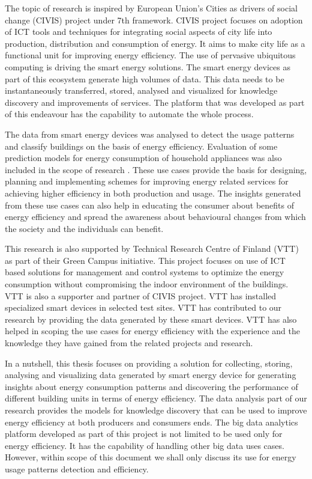 The topic of research is inspired by European Union's Cities as drivers of social change (CIVIS) project under 7th framework. CIVIS project focuses on adoption of ICT tools and techniques for integrating social aspects of city life into production, distribution and consumption of energy. It aims to make city life as a functional unit for improving energy efficiency. The use of pervasive ubiquitous computing is driving the smart energy solutions. The smart energy devices as part of this ecosystem generate high volumes of data. This data needs to be instantaneously transferred, stored, analysed and visualized for knowledge discovery and  improvements of services. The platform that was developed as part of this endeavour has the capability to automate the whole process.
 
The data from smart energy devices was analysed to detect the usage patterns and classify buildings on the basis of energy efficiency. Evaluation of some prediction models for energy consumption of household appliances was also included in the scope of research . These use cases provide the basis for designing, planning and implementing schemes for improving energy related services for  achieving higher efficiency in both production and usage. The insights generated from these use cases can also help in educating the consumer about benefits of energy efficiency and spread the awareness about behavioural changes from which the society and the individuals can benefit. 

This research is also supported by Technical Research Centre of Finland (VTT) as part of their Green Campus initiative. This project focuses on use of ICT based solutions for management and control systems to optimize the energy consumption without compromising the indoor environment of the buildings. VTT is also a supporter and partner of CIVIS project. VTT has installed specialized smart devices in selected test sites. VTT has contributed to our research by providing the data generated by these smart devices. VTT has also helped in scoping the use cases for energy efficiency with the experience and the knowledge they have gained from the related projects and research.

In a nutshell, this thesis focuses on providing a solution for collecting, storing, analysing and visualizing data generated by smart energy device for generating insights about energy consumption patterns and discovering the performance of different building units in terms of energy efficiency. The data analysis part of our research provides the models for knowledge discovery that can be used to improve energy efficiency at both producers and consumers ends. The big data analytics platform developed as part of this project is not limited to be used only for energy efficiency. It has the capability of handling other big data uses cases. However, within scope of this document we shall only discuss its use for energy usage patterns detection and efficiency.     





